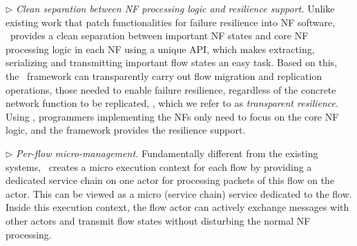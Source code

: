 $\triangleright$ {\em Clean separation between NF processing logic and resilience support.} Unlike existing work
\cite{gember2015opennf, sherry2015rollback} that patch functionalities for failure resilience into NF software, \nfactor~provides a clean separation between important NF states and core NF processing logic in each NF using a unique API, which makes extracting, serializing and transmitting important flow states an easy task.
Based on this, the \nfactor~framework can transparently carry out flow migration and replication operations, those needed to enable failure resilience, regardless of the concrete network function to be replicated, \ie, which we refer to as {\em transparent resilience}. Using \nfactor, programmers implementing the NFs only need to focus on the core NF logic, and the framework provides the resilience support. %


$\triangleright$ {\em Per-flow micro-management.} Fundamentally different from the existing systems, \nfactor~creates a micro execution context for each flow by providing a dedicated service chain on one actor for processing packets of this flow on the actor. This can be viewed as a micro (service chain) service dedicated to the flow.  
 Inside this execution context, the flow actor can actively exchange messages with other actors and transmit flow states without disturbing the normal NF processing. 





